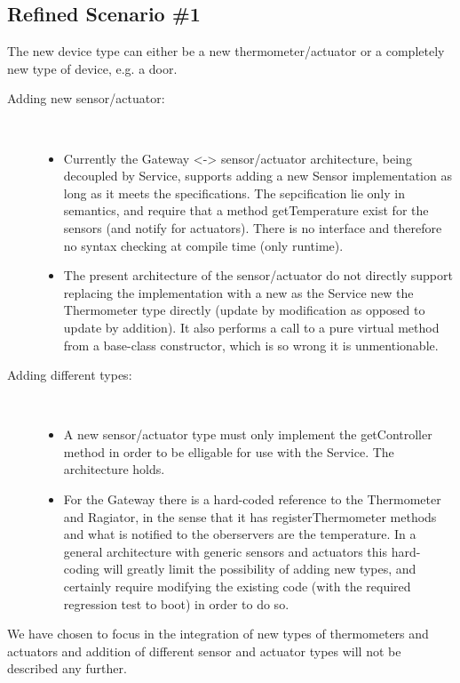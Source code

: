 \documentclass[a4paper,10pt]{article}
\begin{document}
\subsection{Refined Scenario \#1}
The new device type can either be a new thermometer/actuator or a completely new type of device, e.g. a door. 

\begin{description}
\item[Adding new sensor/actuator:] \
\begin{itemize}
\item Currently the Gateway <-> sensor/actuator architecture, being decoupled by Service, supports adding a new Sensor implementation as long as it meets the specifications. The sepcification lie only in semantics, and require that a method getTemperature exist for the sensors (and notify for actuators). There is no interface and therefore no syntax checking at compile time (only runtime).
\item The present architecture of the sensor/actuator do not directly support replacing the implementation with a new as the Service new the Thermometer type directly (update by modification as opposed to update by addition). It also performs a call to a pure virtual method from a base-class constructor, which is so wrong it is unmentionable.
\end{itemize}
\item[Adding different types:] \
\begin{itemize}
\item A new sensor/actuator type must only implement the getController method in order to be elligable for use with the Service. The architecture holds.
\item For the Gateway there is a hard-coded reference to the Thermometer and Ragiator, in the sense that it has registerThermometer methods and what is notified to the oberservers are the temperature. In a general architecture with generic sensors and actuators this hard-coding will greatly limit the possibility of adding new types, and certainly require modifying the existing code (with the required regression test to boot) in order to do so. 
\end{itemize}
\end{description}

We have chosen to focus in the integration of new types of thermometers and actuators and
addition of different sensor and actuator types will not be described any further.
\end{document}
